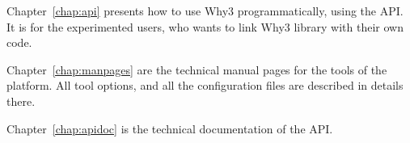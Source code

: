 Chapter~\ref{chap:api} presents how to use Why3 programmatically,
using the API.  It is for the experimented users, who wants to link
Why3 library with their own code.

Chapter~\ref{chap:manpages} are the technical manual pages for the
tools of the platform. All tool options, and all the configuration
files are described in details there.

Chapter~\ref{chap:apidoc} is the technical documentation of the API.



